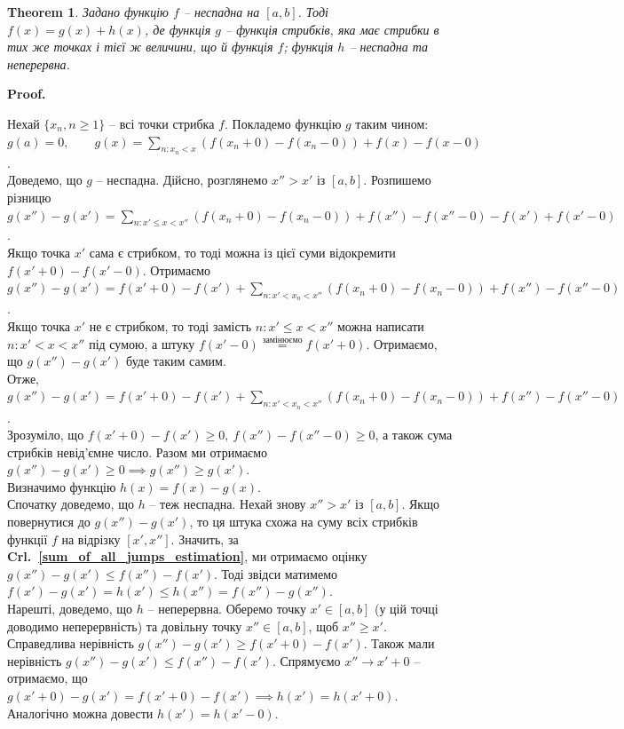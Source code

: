 \documentclass[a4paper, 10pt]{article}
\makeatletter
\theoremstyle{theoremdd}
\newtheorem{theorem}{Theorem}[subsection]
\theoremstyle{theoremdd}
\theoremstyle{theoremdd}
\theoremstyle{theoremdd}
\theoremstyle{theoremdd}
\theoremstyle{theoremdd}
\theoremstyle{theoremdd}
\theoremstyle{theoremdd}
\theoremstyle{theoremdd}
\newcommand\crlref[1]{\textbf{Crl.~\ref{#1}}}
\renewenvironment{proof}[1][Proof.\\]{\par
\pushQED{\hfill \qed}%
\normalfont \topsep6\p@\@plus6\p@\relax
\trivlist
\item\relax
{\bfseries
#1\@addpunct{.}}\hspace\labelsep\ignorespaces
}{%
\popQED\endtrivlist\@endpefalse
}
\makeatother
\begin{document}
\begin{theorem}
Задано функцію $f$ -- неспадна на $[a,b]$. Тоді $f(x) = g(x) + h(x)$, де функція $g$ -- функція стрибків, яка має стрибки в тих же точках і тієї ж величини, що й функція $f$; функція $h$ -- неспадна та неперервна.
\end{theorem}

\begin{proof}
Нехай $\{x_n, n \geq 1\}$ -- всі точки стрибка $f$.  Покладемо функцію $g$ таким чином:\\ $g(a) = 0, \qquad g(x) = \displaystyle\sum_{n: x_n < x}( f(x_n+0) - f(x_n-0)) + f(x) - f(x-0)$.\\
Доведемо, що $g$ -- неспадна. Дійсно, розглянемо $x'' > x'$ із $[a,b]$. Розпишемо різницю\\
$g(x'')-g(x') = \displaystyle\sum_{n: x' \leq x < x''} (f(x_n+0) - f(x_n-0)) + f(x'') - f(x''-0) - f(x') + f(x'-0)$.\\
Якщо точка $x'$ сама є стрибком, то тоді можна із цієї суми відокремити $f(x'+0) - f(x'-0)$. Отримаємо $g(x'')-g(x') = f(x'+0) - f(x') + \displaystyle\sum_{n: x' < x_n < x''} (f(x_n+0) - f(x_n-0)) + f(x'') - f(x''-0)$.\\
Якщо точка $x'$ не є стрибком, то тоді замість $n: x' \leq x < x''$ можна написати $n: x' < x < x''$ під сумою, а штуку $f(x'-0) \overset{\text{замінюємо}}{=} f(x'+0)$. Отримаємо, що $g(x'') - g(x')$ буде таким самим.\\
Отже, $g(x'')-g(x') = f(x'+0) - f(x') + \displaystyle\sum_{n: x' < x_n < x''} (f(x_n+0) - f(x_n-0)) + f(x'') - f(x''-0)$. \\
Зрозуміло, що $f(x'+0) - f(x') \geq 0,\ f(x'') - f(x''-0) \geq 0$, а також сума стрибків невід'ємне число. Разом ми отримаємо $g(x'') - g(x') \geq 0 \implies g(x'') \geq g(x')$.
\bigskip \\
Визначимо функцію $h(x) = f(x) - g(x)$.\\
Спочатку доведемо, що $h$ -- теж неспадна. Нехай знову $x'' > x'$ із $[a,b]$. Якщо повернутися до $g(x'') - g(x')$, то ця штука схожа на суму всіх стрибків функції $f$ на відрізку $[x',x'']$. Значить, за \crlref{sum_of_all_jumps_estimation}, ми отримаємо оцінку $g(x'') - g(x') \leq f(x'') - f(x')$. Тоді звідси матимемо $f(x') - g(x') = h(x') \leq h(x'') = f(x'') - g(x'')$. \\
Нарешті, доведемо, що $h$ -- неперервна. Оберемо точку $x' \in [a,b]$ (у цій точці доводимо неперервність) та довільну точку $x'' \in [a,b]$, щоб $x'' \geq x'$. Справедлива нерівність $g(x'') - g(x') \geq f(x'+0) - f(x')$. Також мали нерівність $g(x'') - g(x') \leq f(x'') - f(x')$. Спрямуємо $x'' \to x'+0$ -- отримаємо, що $g(x'+0) - g(x') = f(x'+0) - f(x') \implies h(x') = h(x'+0)$. Аналогічно можна довести $h(x') = h(x'-0)$.
\end{proof}
\end{document}
